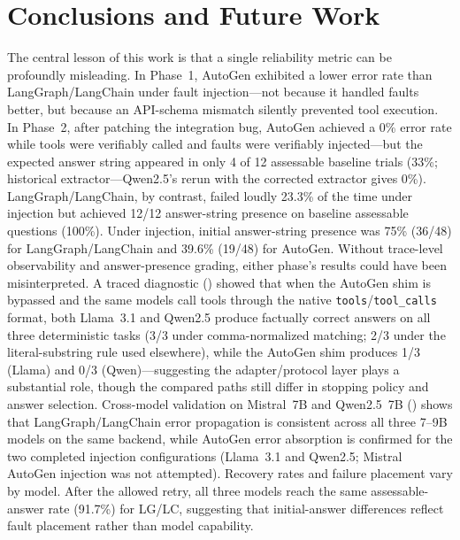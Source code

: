 \documentclass[make,article,submit,moreauthors,pdftex]{mdpi}
\begin{document}
\section{Conclusions and Future Work}\label{sec:conclusion}

The central lesson of this work is that a single reliability metric can be profoundly misleading. In Phase~1, AutoGen exhibited a lower error rate than LangGraph/LangChain under fault injection---not because it handled faults better, but because an API-schema mismatch silently prevented tool execution. In Phase~2, after patching the integration bug, AutoGen achieved a 0\% error rate while tools were verifiably called and faults were verifiably injected---but the expected answer string appeared in only 4 of 12 assessable baseline trials (33\%; historical extractor---Qwen2.5's rerun with the corrected extractor gives 0\%). LangGraph/LangChain, by contrast, failed loudly 23.3\% of the time under injection but achieved 12/12 answer-string presence on baseline assessable questions (100\%). Under injection, initial answer-string presence was 75\% (36/48) for LangGraph/LangChain and 39.6\% (19/48) for AutoGen. Without trace-level observability and answer-presence grading, either phase's results could have been misinterpreted. A traced diagnostic () showed that when the AutoGen shim is bypassed and the same models call tools through the native \texttt{tools}/\texttt{tool\_calls} format, both Llama~3.1 and Qwen2.5 produce factually correct answers on all three deterministic tasks (3/3 under comma-normalized matching; 2/3 under the literal-substring rule used elsewhere), while the AutoGen shim produces 1/3 (Llama) and 0/3 (Qwen)---suggesting the adapter/protocol layer plays a substantial role, though the compared paths still differ in stopping policy and answer selection. Cross-model validation on Mistral~7B and Qwen2.5~7B () shows that LangGraph/LangChain error propagation is consistent across all three 7--9B models on the same backend, while AutoGen error absorption is confirmed for the two completed injection configurations (Llama~3.1 and Qwen2.5; Mistral AutoGen injection was not attempted). Recovery rates and failure placement vary by model. After the allowed retry, all three models reach the same assessable-answer rate (91.7\%) for LG/LC, suggesting that initial-answer differences reflect fault placement rather than model capability.
\end{document}
